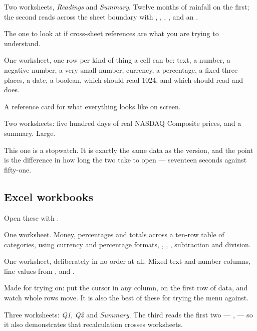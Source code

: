 
Two worksheets, \emph{Readings} and \emph{Summary}. Twelve months of rainfall
on the first; the second reads across the sheet boundary with
, , , ,  and
an .

The one to look at if cross-sheet references are what you are trying to
understand.


One worksheet, one row per kind of thing a cell can be: text, a number, a
negative number, a very small number, currency, a percentage, a fixed three
places, a date, a boolean,  which should read 1024, and
 which should read  and does.

A reference card for what everything looks like on screen.


Two worksheets: five hundred days of real NASDAQ Composite prices, and a
summary. Large.

This one is a stopwatch. It is exactly the same data as the 
version, and the point is the difference in how long the two take to open ---
seventeen seconds against fifty-one.

\subsection{Excel workbooks}

Open these with .


One worksheet. Money, percentages and totals across a ten-row table of
categories, using currency and percentage formats, , ,
, subtraction and division.


One worksheet, deliberately in no order at all. Mixed text and number columns,
line values from ,  and .

Made for trying  on: put the cursor in any column, on
the first row of data, and watch whole rows move. It is also the best of these
for trying the  menu against.


Three worksheets: \emph{Q1}, \emph{Q2} and \emph{Summary}. The third reads the
first two --- ,  --- so it also
demonstrates that recalculation crosses worksheets.

